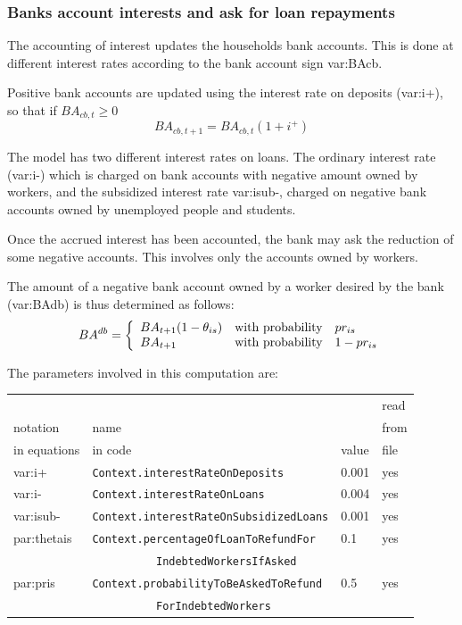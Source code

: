 \documentclass{book}
\begin{document}
\subsubsection{Banks account interests and ask for loan repayments}

The accounting of interest updates the households bank accounts. This is done at different interest rates according to the bank account sign \gls{var:BAcb}.

Positive bank accounts are updated using the interest rate on deposits (\gls{var:i+}), so that if $BA_{cb,t}\ge 0$
\[
BA_{cb,t+1}=BA_{cb,t}(1+i^+)
\]

The model has two different interest rates on loans. The ordinary interest rate (\gls{var:i-}) which is charged on bank accounts with negative amount owned by workers, and the subsidized interest rate \gls{var:isub-}, charged on negative bank accounts owned by unemployed people and students. 

Once the accrued interest has been accounted, the bank may ask the reduction of some negative accounts. This involves only the accounts owned by workers.

 
The amount of a negative bank account owned by a worker desired by the bank (\gls{var:BAdb}) is thus determined as follows:
\[
	BA^{db}=\left\{ 
		\begin{array}{l l l}
			BA_{t+1}(1-\theta_{is})&\textnormal{with probability}& pr_{is}\\
			BA_{t+1}&\textnormal{with probability}& 1-pr_{is}\\
		\end{array}
		\right.
\]

The parameters involved in this computation are:

\vskip2mm
\begin{tabular}{l l l l}
	\hline
	& &&read\\
	notation& name &&from\\
	in equations& in code&value&file\\
	\hline
	\hline
	\gls{var:i+}&\verb+Context.interestRateOnDeposits+&0.001&yes\\
\gls{var:i-}&\verb+Context.interestRateOnLoans+&0.004&yes\\
\gls{var:isub-}&\verb+Context.interestRateOnSubsidizedLoans+&0.001&yes\\
\gls{par:thetais}&\verb+Context.percentageOfLoanToRefundFor+&0.1&yes\\
&\verb+          IndebtedWorkersIfAsked+&&\\
\gls{par:pris}&\verb+Context.probabilityToBeAskedToRefund+&0.5&yes\\
&\verb+          ForIndebtedWorkers+&&\\
	\hline
\end{tabular}
\end{document}
